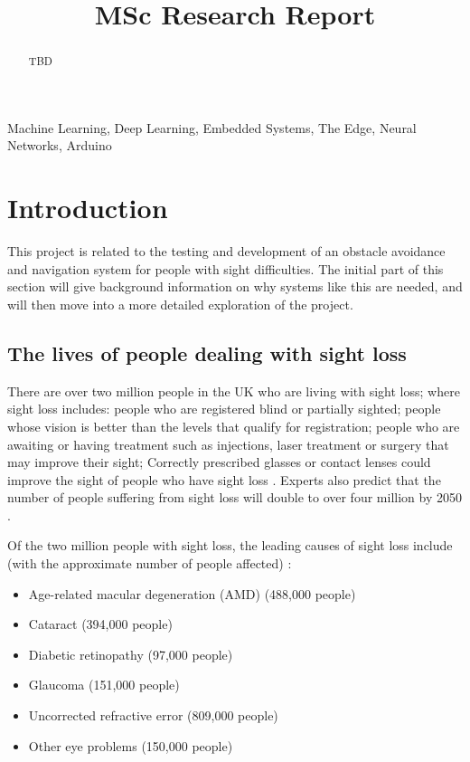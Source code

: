 \documentclass[conference]{IEEEtran}
\begin{document}
\title{MSc Research Report\\}

\author{
}

\maketitle
\thispagestyle{plain}
\pagestyle{plain}

\begin{abstract}
TBD
\end{abstract}

\begin{IEEEkeywords}
Machine Learning, Deep Learning, Embedded Systems, The Edge, Neural Networks, Arduino
\end{IEEEkeywords}

\section{Introduction}
This project is related to the testing and development of an obstacle avoidance and navigation system for people with sight difficulties. The initial part of this section will give background information on why systems like this are needed, and will then move into a more detailed exploration of the project.
\subsection{The lives of people dealing with sight loss}
There are over two million people in the UK who are living with sight loss; where sight loss includes: people who are registered blind or partially sighted; people whose vision is better than the levels that qualify for registration; people who are awaiting or having treatment such as injections, laser treatment or surgery that may improve their sight; Correctly prescribed glasses or contact lenses could improve the sight of people who have sight loss \cite{rnib}. Experts also predict that the number of people suffering from sight loss will double to over four million by 2050 \cite{Pezzullo}.

Of the two million people with sight loss, the leading causes of sight loss include (with the approximate number of people affected) \cite{rnib}:
\begin{itemize}
    \item Age-related macular degeneration (AMD) (488,000 people)
    \item Cataract (394,000 people)
    \item Diabetic retinopathy (97,000 people)
    \item Glaucoma (151,000 people)
    \item Uncorrected refractive error (809,000 people)
    \item Other eye problems (150,000 people)
\end{itemize}
\end{document}
